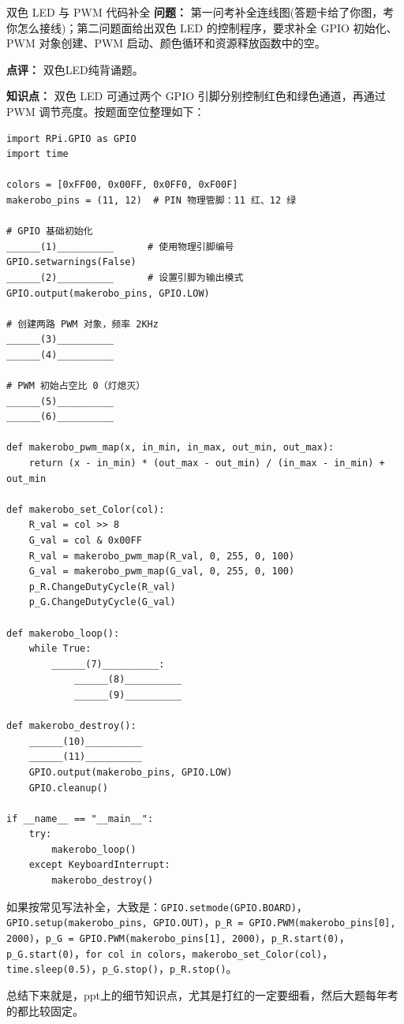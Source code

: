 \begin{question}{双色 LED 与 PWM 代码补全}
\textbf{问题：} 第一问考补全连线图(答题卡给了你图，考你怎么接线)；第二问题面给出双色 LED 的控制程序，要求补全 GPIO 初始化、PWM 对象创建、PWM 启动、颜色循环和资源释放函数中的空。

\textbf{点评：} 双色LED纯背诵题。

\textbf{知识点：} 双色 LED 可通过两个 GPIO 引脚分别控制红色和绿色通道，再通过 PWM 调节亮度。按题面空位整理如下：

\begin{verbatim}
import RPi.GPIO as GPIO
import time

colors = [0xFF00, 0x00FF, 0x0FF0, 0xF00F]
makerobo_pins = (11, 12)  # PIN 物理管脚：11 红、12 绿

# GPIO 基础初始化
______(1)__________      # 使用物理引脚编号
GPIO.setwarnings(False)
______(2)__________      # 设置引脚为输出模式
GPIO.output(makerobo_pins, GPIO.LOW)

# 创建两路 PWM 对象，频率 2KHz
______(3)__________
______(4)__________

# PWM 初始占空比 0（灯熄灭）
______(5)__________
______(6)__________

def makerobo_pwm_map(x, in_min, in_max, out_min, out_max):
    return (x - in_min) * (out_max - out_min) / (in_max - in_min) + out_min

def makerobo_set_Color(col):
    R_val = col >> 8
    G_val = col & 0x00FF
    R_val = makerobo_pwm_map(R_val, 0, 255, 0, 100)
    G_val = makerobo_pwm_map(G_val, 0, 255, 0, 100)
    p_R.ChangeDutyCycle(R_val)
    p_G.ChangeDutyCycle(G_val)

def makerobo_loop():
    while True:
        ______(7)__________:
            ______(8)__________
            ______(9)__________

def makerobo_destroy():
    ______(10)__________
    ______(11)__________
    GPIO.output(makerobo_pins, GPIO.LOW)
    GPIO.cleanup()

if __name__ == "__main__":
    try:
        makerobo_loop()
    except KeyboardInterrupt:
        makerobo_destroy()
\end{verbatim}

如果按常见写法补全，大致是：\texttt{GPIO.setmode(GPIO.BOARD)}，\texttt{GPIO.setup(makerobo\_pins, GPIO.OUT)}，\texttt{p\_R = GPIO.PWM(makerobo\_pins[0], 2000)}，\texttt{p\_G = GPIO.PWM(makerobo\_pins[1], 2000)}，\texttt{p\_R.start(0)}，\texttt{p\_G.start(0)}，\texttt{for col in colors}，\texttt{makerobo\_set\_Color(col)}，\texttt{time.sleep(0.5)}，\texttt{p\_G.stop()}，\texttt{p\_R.stop()}。
\end{question}


总结下来就是，ppt上的细节知识点，尤其是打红的一定要细看，然后大题每年考的都比较固定。
